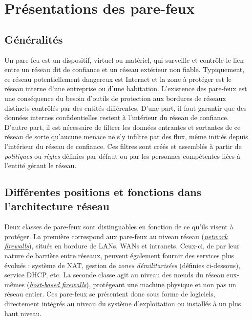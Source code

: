 \documentclass[]{article}
\begin{document}

\section{Présentations des pare-feux}

\subsection{Généralités}\label{gen_FW}

Un pare-feu est un dispositif, virtuel ou matériel, qui surveille et contrôle le lien entre un réseau dit de confiance et un réseau extérieur non fiable. Typiquement, ce réseau potentiellement dangereux est Internet et la zone à protéger est le réseau interne d'une entreprise ou d'une habitation. L'existence des pare-feux est une conséquence du besoin d'outils de protection aux bordures de réseaux distincts contrôlés par des entités différentes. D'une part, il faut garantir que des données internes confidentielles restent à l'intérieur du réseau de confiance. D'autre part, il est nécessaire de filtrer les données entrantes et sortantes de ce réseau de sorte qu'aucune menace ne s'y infiltre par des flux, même initiés depuis l'intérieur du réseau de confiance. Ces filtres sont créés et assemblés à partir de \textit{politiques} ou \textit{règles} définies par défaut ou par les personnes compétentes liées à l'entité gérant le réseau.

\subsection{Différentes positions et fonctions dans l'architecture réseau}

\par Deux classes de pare-feux sont distinguables en fonction de ce qu'ils visent à protéger. La première correspond aux pare-feux au niveau réseau (\hyperref[netw_fw]{\textit{network firewalls}}), situés en bordure de LANs, WANs et intranets. Ceux-ci, de par leur nature de barrière entre réseaux, peuvent également fournir des services plus évolués : système de NAT, gestion de \textit{zones démilitarisées} (définies ci-dessous), service DHCP, etc. \cite{Shimonski2013} La seconde classe agit au niveau des nœuds du réseau eux-mêmes (\hyperref[host_fw]{\textit{host-based firewalls}}), protégeant une machine physique et non pas un réseau entier. Ces pare-feux se présentent donc sous forme de logiciels, directement intégrés au niveau du système d'exploitation ou installés à un plus haut niveau.\\
\end{document}
